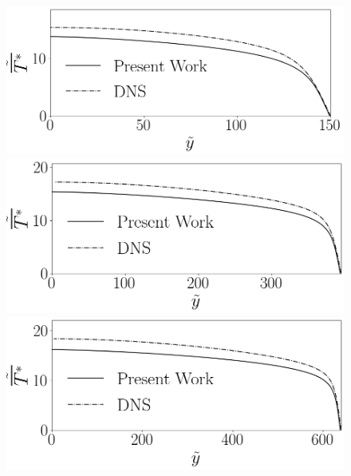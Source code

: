 \begin{figure}[!h]
  \centering
  \begin{minipage}{0.49\textwidth}
    \centering
    \includegraphics[angle=0, scale=0.32]{fotos_formatacao_final/Temperature_150_071_classico}
  \end{minipage}
  \hfill
  \begin{minipage}{0.49\textwidth}
    \centering
    \includegraphics[angle=0, scale=0.32]{fotos_formatacao_final/Temperature_395_071_classico}
  \end{minipage}
  \begin{minipage}{0.49\textwidth}
    \centering
    \includegraphics[angle=0, scale=0.32]{fotos_formatacao_final/Temperature_640_071_classico}

\end{minipage}
\end{figure}
